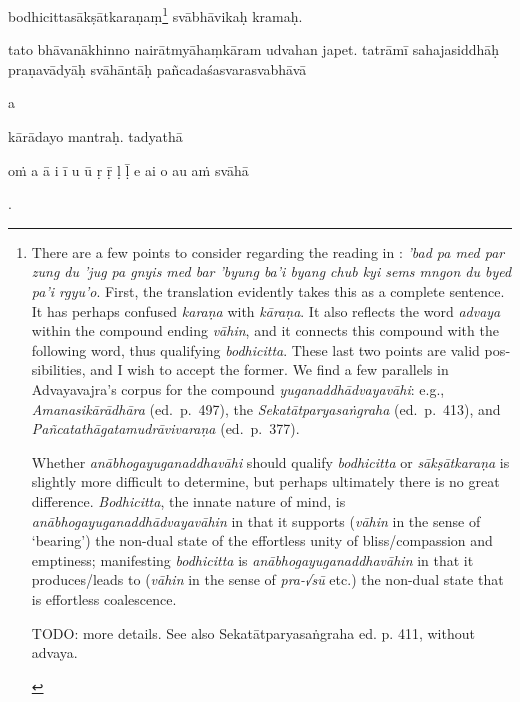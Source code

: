 \documentclass[naipra.tex]{subfiles}
\begin{document}
\begin{sanskrit}
\pstart
{} bodhicittasākṣātkaraṇaṃ\footnote{\begin{english}
	There are a few points to consider regarding the reading in \TIB : \emph{'bad pa med par zung du 'jug pa gnyis med bar 'byung ba'i byang chub kyi sems mngon du byed pa'i rgyu'o}.
	First, the translation evidently takes this as a complete sentence.
	It has perhaps confused \emph{karaṇa} with \emph{kāraṇa}.
	It also reflects the word \emph{advaya} within the compound ending \emph{vāhin}, and it connects this compound with the following word, thus qualifying \emph{bodhicitta}.
	These last two points are valid possibilities, and I wish to accept the former.
	We find a few parallels in Advayavajra's corpus for the compound \emph{yuganaddhādvayavāhi}: e.g., \emph{Amanasikārādhāra} (ed.\ p.\ 497), the \emph{Sekatātparyasaṅgraha} (ed.\ p.\ 413), and \emph{Pañcatathāgatamudrāvivaraṇa} (ed.\ p.\ 377). 

	Whether \emph{anābhogayuganaddhavāhi} should qualify \emph{bodhicitta} or \emph{sākṣātkaraṇa} is slightly more difficult to determine, but perhaps ultimately there is no great difference.
	\emph{Bodhicitta}, the innate nature of mind, is \emph{anābhogayuganaddhādvayavāhin} in that it supports (\emph{vāhin} in the sense of `bearing') the non-dual state of the effortless unity of bliss/compassion and emptiness; manifesting \emph{bodhicitta} is \emph{anābhogayuganaddhavāhin} in that it produces/leads to (\emph{vāhin} in the sense of \emph{pra-√sū} etc.) the non-dual state that is effortless coalescence.%

	TODO: more details. See also Sekatātparyasaṅgraha ed. p. 411, without advaya.
\end{english}} svābhāvikaḥ kramaḥ. 
\pend


\pstart
tato bhāvanākhinno nairātmyāhaṃkāram udvahan  japet.
tatrāmī sahajasiddhāḥ praṇavādyāḥ svāhāntāḥ pañcadaśasvarasvabhāvā \begin{mantra}a\end{mantra}\dsh kārādayo mantraḥ. tadyathā\Emdash \begin{mantra}oṁ a ā i ī u ū ṛ ṝ ḷ ḹ e ai o au aṁ svāhā\end{mantra}.
\pend


\end{sanskrit}
\end{document}
